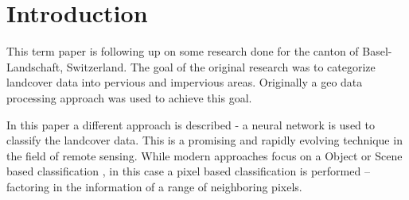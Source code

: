 

\section{Introduction}
\label{introduction}

This term paper is following up on some research done for the canton of Basel-Landschaft, Switzerland.
The goal of the original research was to categorize landcover data into pervious and impervious areas.
Originally a geo data processing approach was used to achieve this goal.

In this paper a different approach is described - a neural network is used to classify the landcover data.
This is a promising and rapidly evolving technique in the field of remote sensing.
While modern approaches focus on a Object or Scene based classification \autocite{thapaDeepLearningRemote2023},
in this case a pixel based classification is performed -- factoring in the information of a range of neighboring pixels.

